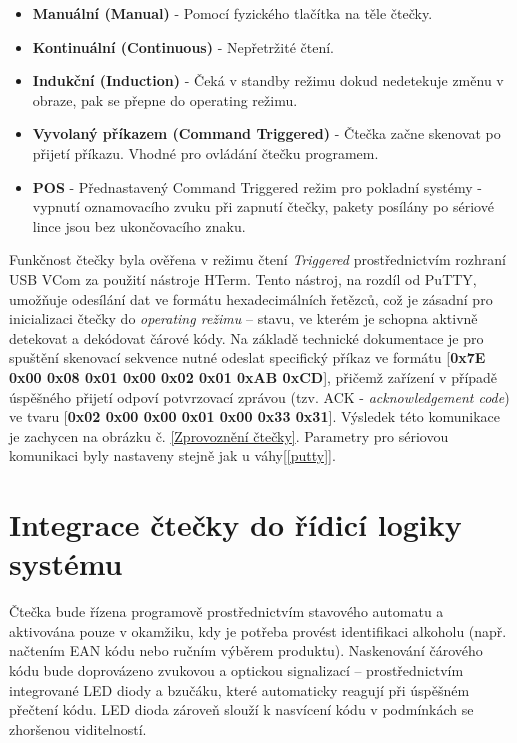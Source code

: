 \begin{itemize}
    \item \textbf{Manuální (Manual)} - Pomocí fyzického tlačítka na těle čtečky.
    \item \textbf{Kontinuální (Continuous)} - Nepřetržité čtení.
    \item \textbf{Indukční (Induction)} - Čeká v standby režimu dokud nedetekuje změnu v obraze, pak se přepne do operating režimu.
    \item \textbf{Vyvolaný příkazem (Command Triggered)} - Čtečka začne skenovat po přijetí příkazu. Vhodné pro ovládání čtečku programem.
    \item \textbf{POS} - Přednastavený Command Triggered režim pro pokladní systémy - vypnutí oznamovacího zvuku při zapnutí čtečky, pakety posílány po sériové lince jsou bez ukončovacího znaku.
\end{itemize}
\bigskip
Funkčnost čtečky byla ověřena v režimu čtení \textit{Triggered} prostřednictvím rozhraní USB VCom za použití nástroje HTerm. Tento nástroj, na rozdíl od PuTTY, umožňuje odesílání dat ve formátu hexadecimálních řetězců, což je zásadní pro inicializaci čtečky do \textit{operating režimu} – stavu, ve kterém je schopna aktivně detekovat a dekódovat čárové kódy. Na základě technické dokumentace je pro spuštění skenovací sekvence nutné odeslat specifický příkaz ve formátu [\textbf{0x7E 0x00 0x08 0x01 0x00 0x02 0x01 0xAB 0xCD}], přičemž zařízení v případě úspěšného přijetí odpoví potvrzovací zprávou (tzv. ACK - \textit{acknowledgement code}) ve tvaru [\textbf{0x02 0x00 0x00 0x01 0x00 0x33 0x31}]. Výsledek této komunikace je zachycen na obrázku č. \ref{Zprovoznění čtečky}. Parametry pro sériovou komunikaci byly nastaveny stejně jak u váhy[\ref{putty}].

\section{Integrace čtečky do řídicí logiky systému}
Čtečka bude řízena programově prostřednictvím stavového automatu a aktivována pouze v okamžiku, kdy je potřeba provést identifikaci alkoholu (např. načtením EAN kódu nebo ručním výběrem produktu). Naskenování čárového kódu bude doprovázeno zvukovou a optickou signalizací – prostřednictvím integrované LED diody a bzučáku, které automaticky reagují při úspěšném přečtení kódu. LED dioda zároveň slouží k nasvícení kódu v podmínkách se zhoršenou viditelností.

